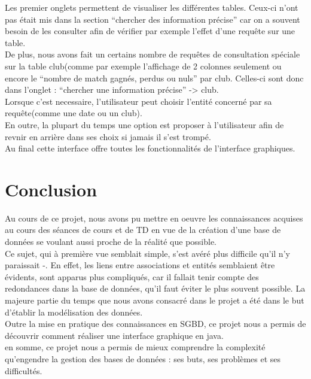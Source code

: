 \documentclass{article}
\begin{document}
Les premier onglets permettent de visualiser les différentes tables. Ceux-ci n'ont pas était mis dans la section ``chercher des information précise'' car on a souvent besoin de les consulter afin de vérifier par exemple l'effet d'une requête sur une table.\\

De plus, nous avons fait un certains nombre de requêtes de consultation spéciale sur la table club(comme par exemple l'affichage de 2 colonnes seulement ou encore le ``nombre de match gagnés, perdus ou nuls'' par club. Celles-ci sont donc dans l'onglet : ``chercher une information précise'' -> club.\\
Lorsque c'est necessaire, l'utilisateur peut choisir l'entité concerné par sa requête(comme une date ou un club).\\

En outre, la plupart du temps une option est proposer à l'utilisateur afin de revnir en arrière dans ses choix si jamais il s'est trompé.\\

Au final cette interface offre toutes les fonctionnalités de l'interface graphiques.

\newpage
\section*{Conclusion}
Au cours de ce projet, nous avons pu mettre en oeuvre les connaissances acquises au cours des séances de cours et de TD en vue de la création d'une base de données se voulant aussi proche de la réalité que possible. \\

Ce sujet, qui à première vue semblait simple, s'est avéré plus difficile qu'il n'y paraissait -. En effet, les liens entre associations et entités semblaient être évidents, sont apparus plus compliqués, car il fallait tenir compte des redondances dans la base de données, qu'il faut éviter le plus souvent possible. La majeure partie du temps que nous avons consacré dans le projet a été dans le but d'établir la modélisation des données.  \\

Outre la mise en pratique des connaissances en SGBD, ce projet nous a permis de découvrir comment réaliser une interface graphique en java. \\

en somme, ce projet nous a permis de mieux comprendre la complexité qu'engendre la gestion des bases de données : ses buts, ses problèmes et ses difficultés. 
\end{document}

